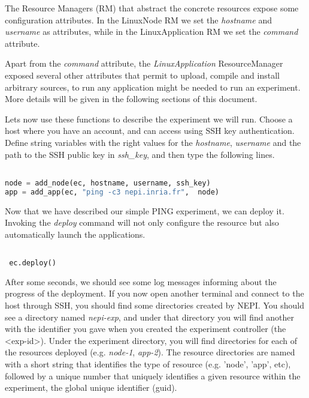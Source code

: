 The Resource Managers (RM) that abstract the concrete resources expose
some configuration attributes. In the LinuxNode RM we set the \emph{hostname} 
and \emph{username} as attributes, while in the LinuxApplication RM 
we set the \emph{command} attribute.

Apart from the \emph{command} attribute, the \emph{LinuxApplication} 
ResourceManager exposed several other attributes
that permit to upload, compile and install arbitrary sources, 
to run any application might be needed to run an experiment. 
More details will be given in the following sections of this document.

Lets now use these functions to describe the experiment we will run. 
Choose a host where you have an account, and can access using SSH
key authentication. Define string variables with the right
values for the  \emph{hostname}, \emph{username} and the path to the
SSH public key in \emph{ssh\_key}, and then type the following lines.

\begin{lstlisting}[language=Python]

node = add_node(ec, hostname, username, ssh_key)
app = add_app(ec, "ping -c3 nepi.inria.fr",  node)

\end{lstlisting}

Now that we have described our simple PING experiment, we can deploy
it. Invoking the \emph{deploy} command will not only configure the 
resource but also automatically launch the applications.

\begin{lstlisting}[language=Python]

 ec.deploy()

\end{lstlisting}

After some seconds, we should see some log messages informing about 
the progress of the deployment.
If you now open another terminal and connect to the host through SSH, 
you should find some directories created by NEPI.
You should see a directory named \emph{nepi-exp}, and under that directory
you will find another with the identifier you gave when you created the 
experiment controller (the <exp-id>). 
Under the experiment directory, you will find directories for each of the 
resources deployed (e.g. \emph{node-1}, \emph{app-2}). 
The resource directories are named with a short string that identifies the
type of resource (e.g. 'node', 'app', etc), followed by a unique number that 
uniquely identifies a given resource within the experiment, 
the global unique identifier (guid).

